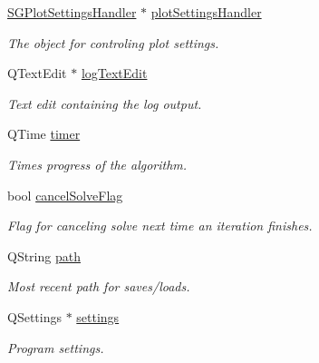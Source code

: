 \begin{DoxyCompactItemize}
\hyperlink{classSGPlotSettingsHandler}{S\+G\+Plot\+Settings\+Handler} $\ast$ \hyperlink{classSGMainWindow_a2acf5b1f87ba1dd721fc916661c1acfe}{plot\+Settings\+Handler}
\begin{DoxyCompactList}\small\item\em The object for controling plot settings. \end{DoxyCompactList}\item 
\mbox{\label{classSGMainWindow_a1bd520ead9bb17f8401a730760962b37}} 
Q\+Text\+Edit $\ast$ \hyperlink{classSGMainWindow_a1bd520ead9bb17f8401a730760962b37}{log\+Text\+Edit}
\begin{DoxyCompactList}\small\item\em Text edit containing the log output. \end{DoxyCompactList}\item 
\mbox{\label{classSGMainWindow_a575a41f119be8c024bead46cbaefb02b}} 
Q\+Time \hyperlink{classSGMainWindow_a575a41f119be8c024bead46cbaefb02b}{timer}
\begin{DoxyCompactList}\small\item\em Times progress of the algorithm. \end{DoxyCompactList}\item 
\mbox{\label{classSGMainWindow_a3fecf45fb589833629f92559ac633b53}} 
bool \hyperlink{classSGMainWindow_a3fecf45fb589833629f92559ac633b53}{cancel\+Solve\+Flag}
\begin{DoxyCompactList}\small\item\em Flag for canceling solve next time an iteration finishes. \end{DoxyCompactList}\item 
\mbox{\label{classSGMainWindow_ae750441d6f1b88af7a3f5f27e839dd8f}} 
Q\+String \hyperlink{classSGMainWindow_ae750441d6f1b88af7a3f5f27e839dd8f}{path}
\begin{DoxyCompactList}\small\item\em Most recent path for saves/loads. \end{DoxyCompactList}\item 
\mbox{\label{classSGMainWindow_a55c71737fb867ee33ffa8ec709c0eca3}} 
Q\+Settings $\ast$ \hyperlink{classSGMainWindow_a55c71737fb867ee33ffa8ec709c0eca3}{settings}
\begin{DoxyCompactList}\small\item\em Program settings. \end{DoxyCompactList}\end{DoxyCompactItemize}


